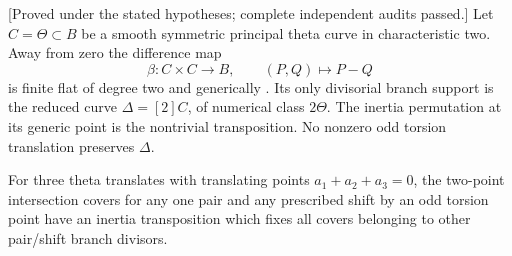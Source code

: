 \begin{lemma}
\label{lem:theta-difference-cover-char2-candidate}
\textup{[Proved under the stated hypotheses; complete independent audits passed.]}
Let $C=\Theta\subset B$ be a smooth symmetric principal theta
curve in characteristic two. Away from zero the difference map
\[
            \beta:C\times C\longrightarrow B,\qquad(P,Q)\mapsto P-Q
\]
is finite flat of degree two and generically \etale. Its only
divisorial branch support is the reduced curve
$\Delta=[2]C$, of numerical class $2\Theta$.
The inertia permutation at its generic point is the nontrivial
transposition. No nonzero odd torsion translation preserves
$\Delta$.

For three theta translates with translating points
$a_1+a_2+a_3=0$, the two-point intersection covers for any one
pair and any prescribed shift by an odd torsion point have an
inertia transposition which fixes all covers belonging to other
pair/shift branch divisors.
\end{lemma}
